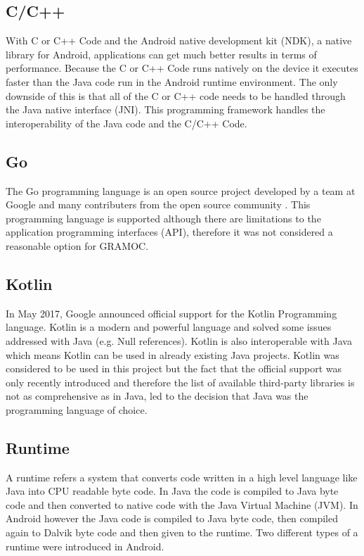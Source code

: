 \subsection{C/C++}
With C or C++ Code and the Android native development kit (NDK), a native library for Android, applications can get much better results in terms of performance. Because the C or C++ Code runs natively on the device it executes faster than the Java code run in the Android runtime environment. The only downside of this is that all of the C or C++ code needs to be handled through the Java native interface (JNI). This programming framework handles the interoperability of the Java code and the C/C++ Code.

\subsection{Go}
The Go programming language is an open source project developed by a team at Google and many contributers from the open source community \cite{GoProject}. This programming language is supported although there are limitations to the application programming interfaces (API), therefore it was not considered a reasonable option for GRAMOC.

\subsection{Kotlin}
In May 2017, Google announced official support for the Kotlin Programming language. Kotlin is a modern and powerful language and solved some issues addressed with Java (e.g. Null references). Kotlin is also interoperable with Java which means Kotlin can be used in already existing Java projects. Kotlin was considered to be used in this project but the fact that the official support was only recently introduced and therefore the list of available third-party libraries is not as comprehensive as in Java, led to the decision that Java was the programming language of choice.

\subsection{Runtime}
A runtime refers a system that converts code written in a high level language like Java into CPU readable byte code. In Java the code is compiled to Java byte code and then converted to native code with the Java Virtual Machine (JVM). In Android however the Java code is compiled to Java byte code, then compiled again to Dalvik byte code and then given to the runtime. Two different types of a runtime were introduced in Android.

